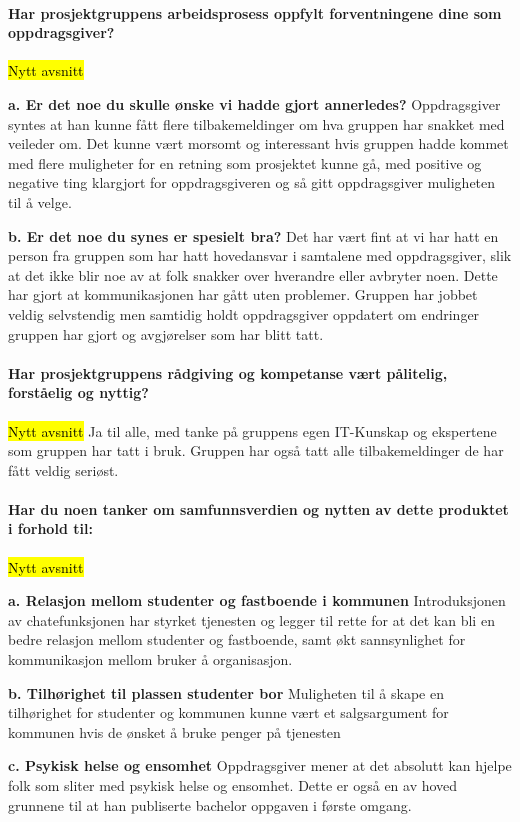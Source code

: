 \paragraph{Har prosjektgruppens arbeidsprosess oppfylt forventningene dine som oppdragsgiver?}
\hl{Nytt avsnitt}

{\bf a. Er det noe du skulle ønske vi hadde gjort annerledes?}
Oppdragsgiver syntes at han kunne fått flere tilbakemeldinger om hva gruppen har snakket med veileder om. Det kunne vært morsomt og interessant hvis gruppen hadde kommet med flere muligheter for en retning som prosjektet kunne gå, med positive og negative ting klargjort for oppdragsgiveren og så gitt oppdragsgiver muligheten til å velge.

{\bf b. Er det noe du synes er spesielt bra?}
Det har vært fint at vi har hatt en person fra gruppen som har hatt hovedansvar i samtalene med oppdragsgiver, slik at det ikke blir noe av at folk snakker over hverandre eller avbryter noen. Dette har gjort at kommunikasjonen  har gått uten problemer. Gruppen har jobbet veldig selvstendig men samtidig holdt oppdragsgiver oppdatert om endringer gruppen har gjort og avgjørelser som har blitt tatt.

\paragraph{Har prosjektgruppens rådgiving og kompetanse vært pålitelig, forståelig og nyttig?}
\hl{Nytt avsnitt}
Ja til alle, med tanke på gruppens egen IT-Kunskap og ekspertene som gruppen har tatt i bruk. Gruppen har også tatt alle tilbakemeldinger de har fått veldig seriøst.

\paragraph{Har du noen tanker om samfunnsverdien og nytten av dette produktet i forhold til:}
\hl{Nytt avsnitt}

{\bf a. Relasjon mellom studenter og fastboende i kommunen}
Introduksjonen av chatefunksjonen har styrket tjenesten og legger til rette for at det kan bli en bedre relasjon mellom studenter og fastboende, samt økt sannsynlighet for kommunikasjon mellom bruker å organisasjon.

{\bf b. Tilhørighet til plassen studenter bor}
Muligheten til å skape en tilhørighet for studenter og kommunen kunne vært et salgsargument for kommunen hvis de ønsket å bruke penger på tjenesten

{\bf c. Psykisk helse og ensomhet}
Oppdragsgiver mener at det absolutt kan hjelpe folk som sliter med psykisk helse og ensomhet. Dette er også en av hoved grunnene til at han publiserte bachelor oppgaven i første omgang.

